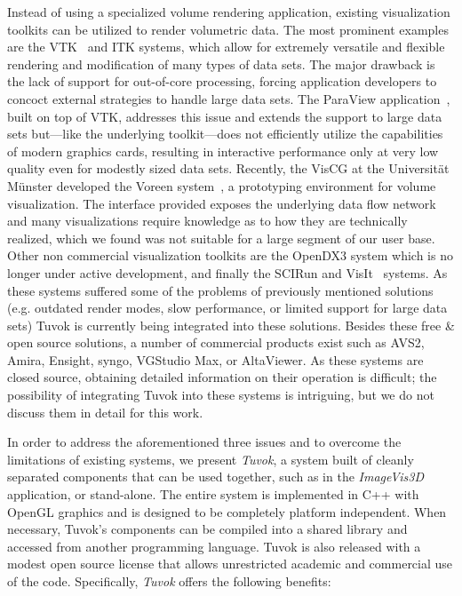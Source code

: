 Instead of using a specialized volume rendering application,
existing visualization toolkits can be utilized to render
volumetric data. The most prominent examples are the
VTK~\cite{Schroeder:2006:VTK} and ITK \todo{[YAL02]} systems, which allow
for extremely versatile and flexible rendering and modification
of many types of data sets. The major drawback is
the lack of support for out-of-core processing, forcing
application developers to concoct external strategies to handle
large data sets. The ParaView application~\cite{Ahrens:2005:ParaView},
built on top of VTK, addresses this issue and extends the support
to large data sets but---like the underlying toolkit---does not
efficiently utilize the capabilities of modern graphics cards,
resulting in interactive performance only at very low quality even for
modestly sized data sets. Recently, the VisCG at the Universit\"at
M\"unster developed the Voreen
system~\cite{Voreen:2009}, a prototyping environment for volume
visualization.  The interface provided exposes the underlying data
flow network and many visualizations require knowledge as to how
they are technically realized, which we found was not suitable for a
large segment of our user base. Other non commercial visualization
toolkits are the OpenDX3 \todo{[IBM06]} system which is no longer under active
development, and
finally the SCIRun \todo{[Ins09]} and VisIt~\cite{Childs:2005:Contracts,
Childs:2012:VisIt} systems. As these systems suffered some of the
problems of previously mentioned solutions (e.g. outdated render modes,
slow performance, or limited support for large data sets) Tuvok is
currently being integrated into these solutions. Besides these free
\& open source solutions, a number of commercial products exist such
as AVS2, Amira, Ensight, syngo, VGStudio Max, or AltaViewer. As these
systems are closed source, obtaining detailed information on their
operation is difficult; the possibility of integrating Tuvok into these
systems is intriguing, but we do not discuss them in detail for this
work.

In order to address the aforementioned three issues and to overcome the
limitations of existing systems, we present \textit{Tuvok}, a system
built of cleanly separated components that can
be used together, such as in the \textit{ImageVis3D} application,
or stand-alone. The entire system is implemented in C++ with OpenGL
graphics and is designed to be completely platform independent. When
necessary, Tuvok's components can be compiled into a shared library
and accessed from another programming language. Tuvok is also released
with a modest open source license that allows unrestricted academic and
commercial use of the code. Specifically,
\textit{Tuvok} offers the following benefits:

